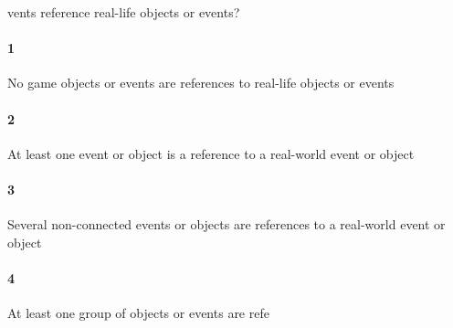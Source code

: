 vents reference real-life objects or events?\paragraph{1}No game objects or events are references to real-life objects or events\paragraph{2}At least one event or object is a reference to a real-world event or object\paragraph{3}Several non-connected events or objects are references to a real-world event or object\paragraph{4}At least one group of objects or events are refe